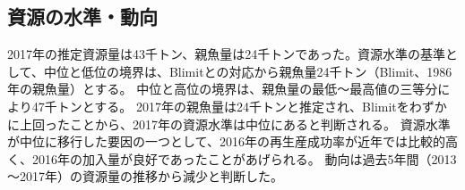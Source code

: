 \subsection{資源の水準・動向}
2017年の推定資源量は{43千トン}、親魚量は{24千トン}であった。資源水準の基準として、中位と低位の境界は、Blimitとの対応から親魚量{24千トン}（Blimit、1986年の親魚量）とする。
中位と高位の境界は、親魚量の最低～最高値の三等分により{47千トン}とする。
{2017年}の親魚量は{24千トン}と推定され、Blimitをわずかに上回ったことから、{2017年}の資源水準は{中位}にあると判断される。
資源水準が中位に移行した要因の一つとして、{2016年}の再生産成功率が近年では比較的高く、{2016年}の加入量が良好であったことがあげられる。
動向は過去5年間（{2013～2017年}）の資源量の推移から減少と判断した。

